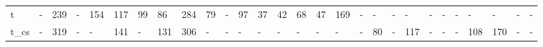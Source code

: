 \begin{tabular}{llllllllllllllllllllllllllll}
t    &     - &   239 &     - &   154 &    117 &    99 &    86 &   284 &    79 &     - &    97 &    37 &    42 &    68 &    47 &    169 &      - &      - &      - &      - &      - &      - &      - &      - &      - &      - &      - \\
t\_cs &     - &   319 &     - &     - &    141 &     - &   131 &   306 &     - &     - &     - &     - &     - &     - &     - &      - &      - &     80 &      - &    117 &      - &      - &      - &    108 &    170 &      - &      - \\
\bottomrule
\end{tabular}
